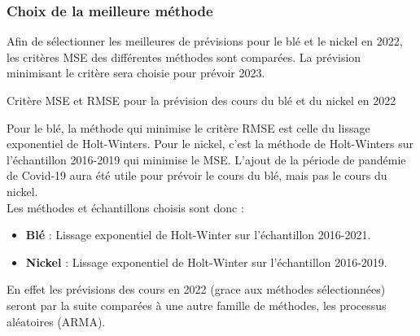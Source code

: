 \subsubsection{Choix de la meilleure méthode}
Afin de sélectionner les meilleures de prévisions pour le blé et le nickel en 2022, les critères MSE des différentes méthodes sont comparées. La prévision minimisant le 
critère sera choisie pour prévoir 2023.
\begin{table}[H]
     \centering
     \caption{Critère MSE et RMSE pour la prévision des cours du blé et du nickel en 2022}
     \sffamily
     
\end{table}
Pour le blé, la méthode qui minimise le critère RMSE est celle du lissage exponentiel de Holt-Winters. Pour le nickel, c'est la méthode de Holt-Winters sur l'échantillon
2016-2019 qui minimise le MSE. L'ajout de la période de pandémie de Covid-19 aura été utile pour prévoir le cours du blé, mais pas le cours du nickel.\\[11pt]
Les méthodes et échantillons choisis sont donc :
\begin{itemize}
    \item\textbf{Blé}  : Lissage exponentiel de Holt-Winter sur l'échantillon 2016-2021.
    \item\textbf{Nickel}  : Lissage exponentiel de Holt-Winter sur l'échantillon 2016-2019.
\end{itemize}
En effet les prévisions des cours en 2022 (grace aux méthodes sélectionnées) seront par la suite comparées à une autre famille de méthodes, les processus aléatoires 
(ARMA).